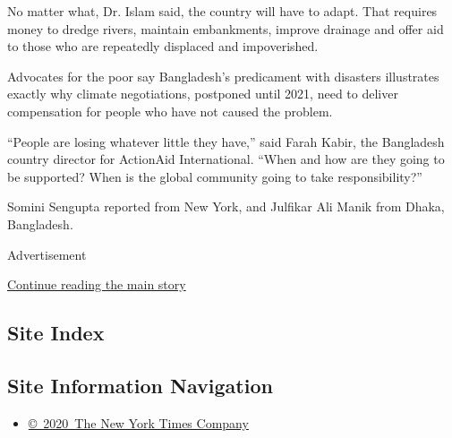 No matter what, Dr. Islam said, the country will have to adapt. That
requires money to dredge rivers, maintain embankments, improve drainage
and offer aid to those who are repeatedly displaced and impoverished.

Advocates for the poor say Bangladesh's predicament with disasters
illustrates exactly why climate negotiations, postponed until 2021, need
to deliver compensation for people who have not caused the problem.

``People are losing whatever little they have,'' said Farah Kabir, the
Bangladesh country director for ActionAid International. ``When and how
are they going to be supported? When is the global community going to
take responsibility?''

Somini Sengupta reported from New York, and Julfikar Ali Manik from
Dhaka, Bangladesh.

Advertisement

\protect\hyperlink{after-bottom}{Continue reading the main story}

\hypertarget{site-index}{%
\subsection{Site Index}\label{site-index}}

\hypertarget{site-information-navigation}{%
\subsection{Site Information
Navigation}\label{site-information-navigation}}

\begin{itemize}
\tightlist
\item
  \href{https://help.nytimes3xbfgragh.onion/hc/en-us/articles/115014792127-Copyright-notice}{©~2020~The
  New York Times Company}
\end{itemize}

